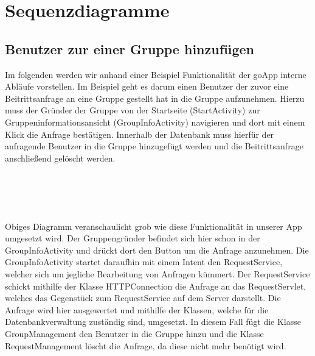 \section{Sequenzdiagramme}

\subsection{Benutzer zur einer Gruppe hinzufügen}
Im folgenden werden wir anhand einer Beispiel Funktionalität der goApp interne Abläufe vorstellen.
Im Beispiel geht es darum einen Benutzer der zuvor eine Beitrittsanfrage an eine Gruppe gestellt hat in die Gruppe aufzunehmen.
Hierzu muss der Gründer der Gruppe von der Startseite (StartActivity) zur Gruppeninformationsansicht (GroupInfoActivity) navigieren und dort mit einem Klick die Anfrage bestätigen.
Innerhalb der Datenbank muss hierfür der anfragende Benutzer in die Gruppe hinzugefügt werden und die Beitrittsanfrage anschließend gelöscht werden.
\ \\
\ \\
\ \\
\begin {center}
\end {center}
\ \\
\ \\
Obiges Diagramm veranschaulicht grob wie diese Funktionalität in unserer App umgesetzt wird.
Der Gruppengründer befindet sich hier schon in der GroupInfoActivity und drückt dort den Button um die Anfrage anzunehmen.
Die GroupInfoActivity startet daraufhin mit einem Intent den RequestService, welcher sich um jegliche Bearbeitung von Anfragen kümmert.
Der RequestService schickt mithilfe der Klasse HTTPConnection die Anfrage an das RequestServlet, welches das Gegenstück zum RequestService auf dem Server darstellt.
Die Anfrage wird hier ausgewertet und mithilfe der Klassen, welche für die Datenbankverwaltung zuständig sind, umgesetzt. In diesem Fall fügt die Klasse GroupManagement den Benutzer in die Gruppe hinzu und die Klasse RequestManagement löscht die Anfrage, da diese nicht mehr benötigt wird.
